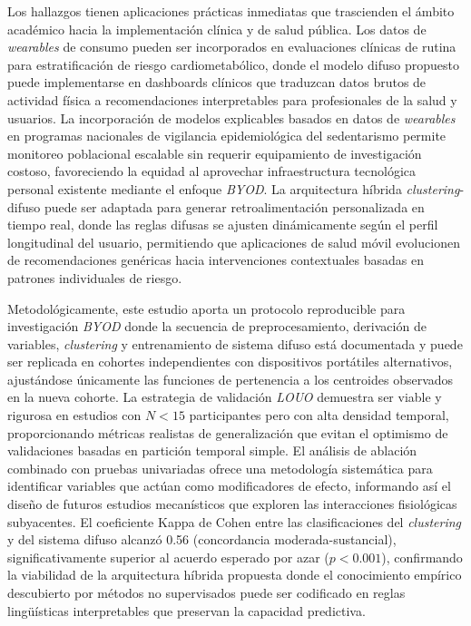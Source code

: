 Los hallazgos tienen aplicaciones prácticas inmediatas que trascienden el ámbito académico hacia la implementación clínica y de salud pública. Los datos de \textit{wearables} de consumo pueden ser incorporados en evaluaciones clínicas de rutina para estratificación de riesgo cardiometabólico, donde el modelo difuso propuesto puede implementarse en dashboards clínicos que traduzcan datos brutos de actividad física a recomendaciones interpretables para profesionales de la salud y usuarios. La incorporación de modelos explicables basados en datos de \textit{wearables} en programas nacionales de vigilancia epidemiológica del sedentarismo permite monitoreo poblacional escalable sin requerir equipamiento de investigación costoso, favoreciendo la equidad al aprovechar infraestructura tecnológica personal existente mediante el enfoque \textit{BYOD}. La arquitectura híbrida \textit{clustering}-difuso puede ser adaptada para generar retroalimentación personalizada en tiempo real, donde las reglas difusas se ajusten dinámicamente según el perfil longitudinal del usuario, permitiendo que aplicaciones de salud móvil evolucionen de recomendaciones genéricas hacia intervenciones contextuales basadas en patrones individuales de riesgo.

Metodológicamente, este estudio aporta un protocolo reproducible para investigación \textit{BYOD} donde la secuencia de preprocesamiento, derivación de variables, \textit{clustering} y entrenamiento de sistema difuso está documentada y puede ser replicada en cohortes independientes con dispositivos portátiles alternativos, ajustándose únicamente las funciones de pertenencia a los centroides observados en la nueva cohorte. La estrategia de validación \textit{LOUO} demuestra ser viable y rigurosa en estudios con $N < 15$ participantes pero con alta densidad temporal, proporcionando métricas realistas de generalización que evitan el optimismo de validaciones basadas en partición temporal simple. El análisis de ablación combinado con pruebas univariadas ofrece una metodología sistemática para identificar variables que actúan como modificadores de efecto, informando así el diseño de futuros estudios mecanísticos que exploren las interacciones fisiológicas subyacentes. El coeficiente Kappa de Cohen entre las clasificaciones del \textit{clustering} y del sistema difuso alcanzó 0.56 (concordancia moderada-sustancial), significativamente superior al acuerdo esperado por azar ($p < 0.001$), confirmando la viabilidad de la arquitectura híbrida propuesta donde el conocimiento empírico descubierto por métodos no supervisados puede ser codificado en reglas lingüísticas interpretables que preservan la capacidad predictiva.


